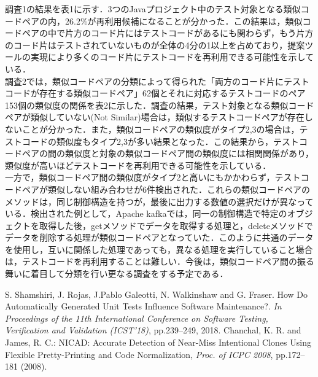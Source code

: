 \documentclass{fose2019}           %
\begin{document}
調査1の結果を表1に示す．3つのJavaプロジェクト中のテスト対象となる類似コードペアの内，26.2\%が再利用候補になることが分かった．この結果は，類似コードペアの中で片方のコード片にはテストコードがあるにも関わらず，もう片方のコード片はテストされていないものが全体の4分の1以上を占めており，提案ツールの実現により多くのコード片にテストコードを再利用できる可能性を示している．
\\\indent 調査2では，類似コードペアの分類によって得られた「両方のコード片にテストコードが存在する類似コードペア」62個とそれに対応するテストコードのペア153個の類似度の関係を表2に示した．調査の結果，テスト対象となる類似コードペアが類似していない(Not Similar)場合は，類似するテストコードペアが存在しないことが分かった．また，類似コードペアの類似度がタイプ2,3の場合は，テストコードの類似度もタイプ2,3が多い結果となった．この結果から，テストコードペアの間の類似度と対象の類似コードペア間の類似度には相関関係があり，類似度が高いほどテストコードを再利用できる可能性を示している．
\\\indent 一方で，類似コードペア間の類似度がタイプ2と高いにもかかわらず，テストコードペアが類似しない組み合わせが6件検出された．これらの類似コードペアのメソッドは，同じ制御構造を持つが，最後に出力する数値の選択だけが異なっている．検出された例として，Apache kafkaでは，同一の制御構造で特定のオブジェクトを取得した後，getメソッドでデータを取得する処理と，deleteメソッドでデータを削除する処理が類似コードペアとなっていた．このように共通のデータを使用し，互いに関係した処理であっても，異なる処理を実行していること場合は，テストコードを再利用することは難しい．今後は，類似コードペア間の振る舞いに着目して分類を行い更なる調査をする予定である．


%

\begin{thebibliography}{2}
 S. Shamshiri, J. Rojas, J.Pablo Galeotti, N. Walkinshaw and G. Fraser. How Do Automatically Generated Unit Tests Influence Software Maintenance?.  {\it In Proceedings of the 11th International Conference on Software Testing, Verification and Validation (ICST'18)}, pp.239--249, 2018.
 Chanchal, K. R. and James, R. C.: NICAD: Accurate Detection of Near-Miss Intentional Clones Using Flexible Pretty-Printing and Code Normalization, {\it Proc. of ICPC 2008}, pp.172--181 (2008).
\end{thebibliography}
\end{document}

